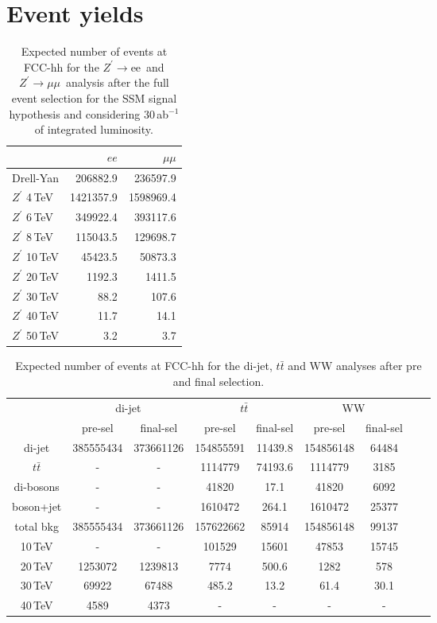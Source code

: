 \documentclass[a4paper,11pt]{article}
\newcommand{\Zp}{\ensuremath{Z^{\prime}}}
\newcommand*{\Zpee}{\ensuremath{Z^{\prime}\rightarrow \text{ee}}}
\newcommand*{\Zpmumu}{\ensuremath{Z^{\prime}\rightarrow \mu\mu}}
\newcommand*{\ttbar}{\ensuremath{t\bar{t}}}
\begin{document}
\section{Event yields}%
\label{app:yields}
\begin{table}[htbp]
   \centering
\begin{tabular}{|l|r|r|}
  \hline
 & $ee$ & $\mu\mu$  \\
  \hline
  Drell-Yan & 206882.9 & 236597.9 \\
  \hline
  $\Zp$ 4\,TeV & 1421357.9    & 1598969.4 \\
  $\Zp$ 6\,TeV & 349922.4  & 393117.6\\
  $\Zp$ 8\,TeV &   115043.5 & 129698.7 \\
  $\Zp$ 10\,TeV &  45423.5 & 50873.3 \\
  $\Zp$ 20\,TeV &  1192.3 & 1411.5\\
  $\Zp$ 30\,TeV &  88.2 & 107.6\\
  $\Zp$ 40\,TeV &  11.7 & 14.1 \\
  $\Zp$ 50\,TeV &  3.2 & 3.7\\
  \hline
  \hline
\end{tabular}
  \caption{Expected number of events at FCC-hh for the \Zpee\ and \Zpmumu\ analysis after the full event selection for the SSM signal hypothesis and considering 30\,ab$^{-1}$ of integrated luminosity.}
  \label{tab:leptonicresonances:yieldsll}
\end{table}


\begin{table}[htbp]
   \centering
\begin{tabular}{|c|c|c|c|c|c|c|c|c|}
  \hline
  \hline
  & \multicolumn{2}{c|}{di-jet}  & \multicolumn{2}{c|}{$\ttbar$} & \multicolumn{2}{c|}{WW} \\
  \cline{2-7}

 & pre-sel & final-sel  & pre-sel & final-sel & pre-sel & final-sel\\
  \hline
  di-jet & 385555434 &  373661126 &  154855591 & 11439.8&  154856148 & 64484\\
  $\ttbar$ & - & - & 1114779 & 74193.6 &  1114779 & 3185\\
  di-bosons & - & - &  41820 &  17.1 &  41820 & 6092\\
  boson+jet & - & - & 1610472 & 264.1&  1610472 & 25377\\
  \hline
  total bkg  &  385555434& 373661126& 157622662 & 85914 & 154856148 & 99137\\
  \hline
  10\,TeV &  - & - &  101529 & 15601 &  47853 & 15745\\
  20\,TeV &   1253072 &  1239813& 7774 & 500.6 & 1282 & 578\\
  30\,TeV &  69922 &  67488 & 485.2 & 13.2 &  61.4 & 30.1 \\
  40\,TeV &  4589 &  4373 & - & - & - & -\\
  \hline
  \hline
\end{tabular}
  \caption{Expected number of events at FCC-hh for the di-jet, $\ttbar$ and WW analyses after pre and final selection.}
  \label{tab:hadronicresonances:yields}
\end{table}
\end{document}
